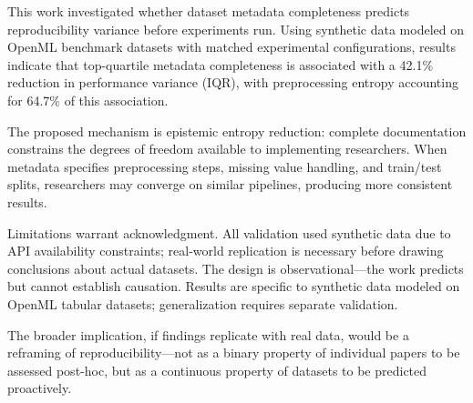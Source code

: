 
This work investigated whether dataset metadata completeness predicts reproducibility variance before experiments run. Using synthetic data modeled on OpenML benchmark datasets with matched experimental configurations, results indicate that top-quartile metadata completeness is associated with a 42.1\% reduction in performance variance (IQR), with preprocessing entropy accounting for 64.7\% of this association.

The proposed mechanism is epistemic entropy reduction: complete documentation constrains the degrees of freedom available to implementing researchers. When metadata specifies preprocessing steps, missing value handling, and train/test splits, researchers may converge on similar pipelines, producing more consistent results.

Limitations warrant acknowledgment. All validation used synthetic data due to API availability constraints; real-world replication is necessary before drawing conclusions about actual datasets. The design is observational---the work predicts but cannot establish causation. Results are specific to synthetic data modeled on OpenML tabular datasets; generalization requires separate validation.

The broader implication, if findings replicate with real data, would be a reframing of reproducibility---not as a binary property of individual papers to be assessed post-hoc, but as a continuous property of datasets to be predicted proactively.


